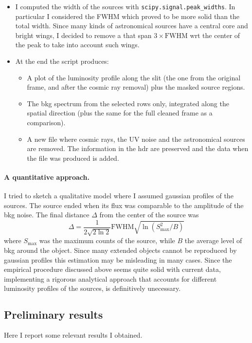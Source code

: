 \documentclass{article}
\begin{document}
\begin{itemize}
	\item I computed the width of the sources with \texttt{scipy.signal.peak\_widths}. In particular I considered the FWHM which proved to be more solid than the total width. Since many kinds of astronomical sources have a central core and bright wings, I decided to remove a that span $3\times\text{FWHM}$ wrt the center of the peak to take into account such wings.	
	
	\item At the end the script produces:
	\begin{itemize}
		\item A plot of the luminosity profile along the slit (the one from the original frame, and after the cosmic ray removal) plus the masked source regions.
		\item The bkg spectrum from the selected rows only, integrated along the spatial direction (plus the same for the full cleaned frame as a comparison).
		\item A new file where cosmic rays, the UV noise and the astronomical sources are removed. The information in the hdr are preserved and the data when the file was produced is added.
	\end{itemize}
\end{itemize}


\paragraph{A quantitative approach.} I tried to sketch a qualitative model where I assumed gaussian profiles of the sources. The source ended when its flux was comparable to the amplitude of the bkg noise. The final distance $\Delta$ from the center of the source was
\[\Delta = \frac{1}{2\sqrt{2\ln 2}}\text{FWHM}\sqrt{\ln(S_\text{max}^2/B)}   \]
where $S_\text{max}$ was the maximum counts of the source, while $B$ the average level of bkg around the object. Since many extended objects cannot be reproduced by gaussian profiles this estimation may be misleading in many cases. Since the empirical procedure discussed above seems quite solid with current data, implementing a rigorous analytical approach that accounts for different luminosity profiles of the sources, is definitively unecessary.

\subsection{Preliminary results}
Here I report some relevant results I obtained.
\end{document}
